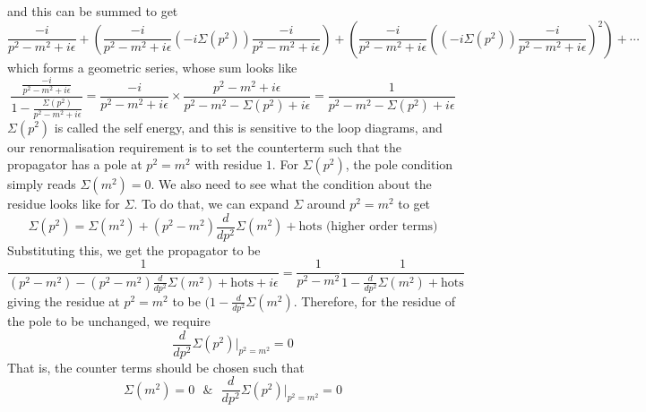 \documentclass[11pt, notitlepage]{report}
\numberwithin{equation}{section}
\begin{document}
and this can be summed to get 
\begin{equation*}
    \frac{-i}{p^2 - m^2 + i\epsilon} + \left( \frac{-i}{p^2 - m^2 + i\epsilon}(-i\Sigma(p^2))\frac{-i}{p^2 - m^2 + i\epsilon}\right) + \left(\frac{-i}{p^2 - m^2 + i\epsilon}\left((-i\Sigma(p^2))\frac{-i}{p^2 - m^2 + i\epsilon}\right)^2 \right) + \cdots
\end{equation*}
which forms a geometric series, whose sum looks like 
\begin{equation*}
    \displaystyle \frac{\displaystyle \frac{-i}{p^2 - m^2 + i\epsilon}}{\displaystyle 1 - \frac{\Sigma(p^2)}{p^2 - m^2 + i\epsilon}} = \frac{-i}{p^2 - m^2 + i\epsilon} \times \frac{p^2 - m^2 + i\epsilon}{p^2 - m^2 - \Sigma(p^2) + i\epsilon} = \frac{1}{p^2 - m^2 - \Sigma(p^2) + i\epsilon}
\end{equation*}
\(\Sigma(p^2)\) is called the self energy, and this is sensitive to the loop diagrams, and our renormalisation requirement is to set the counterterm such that the propagator has a pole at \(p^2 = m^2\) with residue \(1\). For \(\Sigma(p^2)\), the pole condition simply reads \(\Sigma(m^2) = 0\). We also need to see what the condition about the residue looks like for \(\Sigma\). To do that, we can expand \(\Sigma\) around \(p^2 = m^2\) to get  
\begin{equation*}
    \Sigma(p^2) = \Sigma(m^2) + (p^2 - m^2)\frac{d}{dp^2}\Sigma(m^2) + \text{hots (higher order terms)}
\end{equation*}
Substituting this, we get the propagator to be
\begin{equation*}
    \frac{1}{\displaystyle(p^2 - m^2) - (p^2 - m^2)\frac{d}{dp^2}\Sigma(m^2) + \text{hots} + i\epsilon} = \frac{1}{p^2 - m^2}\frac{1}{\displaystyle 1-\frac{d}{dp^2}\Sigma(m^2) + \text{hots}}
\end{equation*}
giving the residue at \(p^2 = m^2\) to be \((\displaystyle 1-\frac{d}{dp^2}\Sigma(m^2)\). Therefore, for the residue of the pole to be unchanged, we require 
\begin{equation*}
    \frac{d}{dp^2}\Sigma(p^2)\bigg|_{p^2 = m^2} = 0
\end{equation*}
That is, the counter terms should be chosen such that 
\begin{equation*}
    \Sigma(m^2) = 0 ~~~\&~~~ \frac{d}{dp^2}\Sigma(p^2)\bigg|_{p^2 = m^2} = 0
\end{equation*}
\vspace{10pt}
\end{document}
